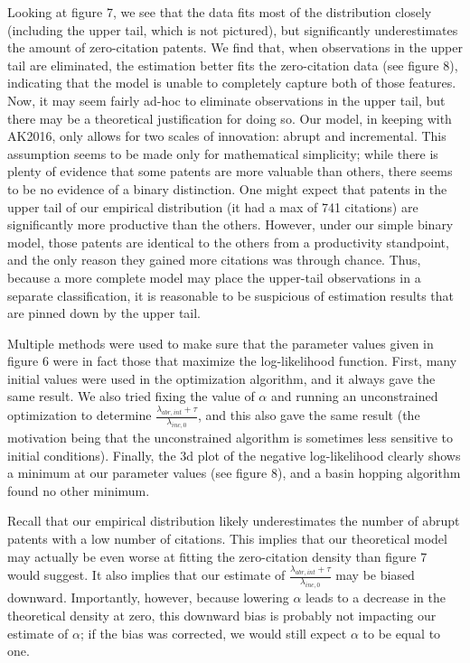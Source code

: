 \documentclass[letterpaper,12pt]{article}
\theoremstyle{definition}
\begin{document}
Looking at figure 7, we see that the data fits most of the distribution closely (including the upper tail, which is not pictured), but significantly underestimates the amount of zero-citation patents. We find that, when observations in the upper tail are eliminated, the estimation better fits the zero-citation data (see figure 8), indicating that the model is unable to completely capture both of those features. Now, it may seem fairly ad-hoc to eliminate observations in the upper tail, but there may be a theoretical justification for doing so. Our model, in keeping with AK2016, only allows for two scales of innovation: abrupt and incremental. This assumption seems to be made only for mathematical simplicity; while there is plenty of evidence that some patents are more valuable than others, there seems to be no evidence of a binary distinction. One might expect that patents in the upper tail of our empirical distribution (it had a max of 741 citations) are significantly more productive than the others. However, under our simple binary model, those patents are identical to the others from a productivity standpoint, and the only reason they gained more citations was through chance. Thus, because a more complete model may place the upper-tail observations in a separate classification, it is reasonable to be suspicious of estimation results that are pinned down by the upper tail.

Multiple methods were used to make sure that the parameter values given in figure 6 were in fact those that maximize the log-likelihood function. First, many initial values were used in the optimization algorithm, and it always gave the same result. We also tried fixing the value of $\alpha$ and running an unconstrained optimization to determine $\frac{\lambda_{abr, int} + \tau}{\lambda_{inc,0}}$, and this also gave the same result (the motivation being that the unconstrained algorithm is sometimes less sensitive to initial conditions). Finally, the 3d plot of the negative log-likelihood clearly shows a minimum at our parameter values (see figure 8), and a basin hopping algorithm found no other minimum.

Recall that our empirical distribution likely underestimates the number of abrupt patents with a low number of citations. This implies that our theoretical model may actually be even worse at fitting the zero-citation density than figure 7 would suggest. It also implies that our estimate of $\frac{\lambda_{abr, int} + \tau}{\lambda_{inc,0}}$ may be biased downward. Importantly, however, because lowering $\alpha$ leads to a decrease in the theoretical density at zero, this downward bias is probably not impacting our estimate of $\alpha$; if the bias was corrected, we would still expect $\alpha$ to be equal to one.
\end{document}
